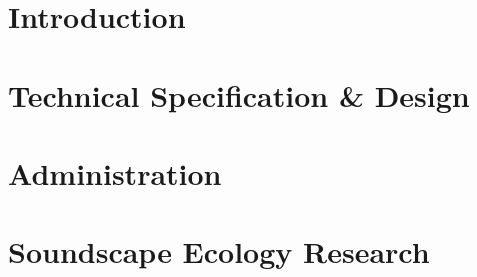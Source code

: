 \documentclass[12pt]{article}
\begin{document}
  
  \pagestyle{empty}                                     %
  \tableofcontents
  \newpage


  \pagestyle{plain} %
  \setcounter{page}{1}

  \section{Introduction}
  
  
  
  \newpage

  \section{Technical Specification \& Design}
  
  
  
  
  
  
  
  
  
  
  
  
  
  
  
  
  \newpage

  \section{Administration}
  
  
  
  
  \newpage

  \section{Soundscape Ecology Research}
  
  
  
  
  \newpage

  \thispagestyle{empty}
  \printbibliography
\end{document}
